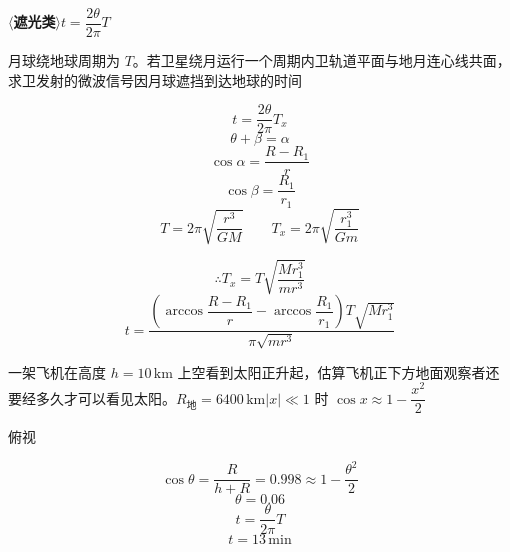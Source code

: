 $\langle$\textbf{遮光类}$\rangle$\quad $t=\dfrac{2\theta}{2\pi}T$%
\begin{problem}[1.]
月球绕地球周期为 $T$。若卫星绕月运行一个周期内卫轨道平面与地月连心线共面，求卫发射的微波信号因月球遮挡到达地球的时间%
\begin{solution}
\[ t=\frac{2\theta}{2\pi}T_x \]
\[ \theta+\beta=\alpha \]
\[ \cos\alpha=\frac{R-R_1}{r} \]
\[ \cos\beta=\frac{R_1}{r_1} \]
\[ T=2\pi\sqrt{\frac{r^3}{GM}}\qquad T_x=2\pi\sqrt{\frac{r_1^3}{Gm}} \]
\begin{center}
\end{center}
\[ \therefore T_x=T\sqrt{\frac{Mr_1^3}{mr^3}} \]
\[ t=\frac{\left(\arccos\dfrac{R-R_1}{r}-\arccos\dfrac{R_1}{r_1}\right)T\sqrt{Mr_1^3}}{\pi\sqrt{mr^3}} \]
\end{solution}
\end{problem}
\begin{problem}[2.]
一架飞机在高度 $h=10\,\mathrm{km}$ 上空看到太阳正升起，估算飞机正下方地面观察者还要经多久才可以看见太阳。$R_{\text{地}}=6400\,\mathrm{km}$\quad $|x|\ll1$ 时 $\cos x\approx1-\dfrac{x^2}{2}$
\begin{solution}
俯视

\[ \cos\theta=\frac{R}{h+R}=0.998\approx1-\frac{\theta^2}{2} \]
\[ \theta=0.06 \]
\[ t=\frac{\theta}{2\pi}T \]
\[ t=13\,\mathrm{min} \]
\end{solution}
\end{problem}
